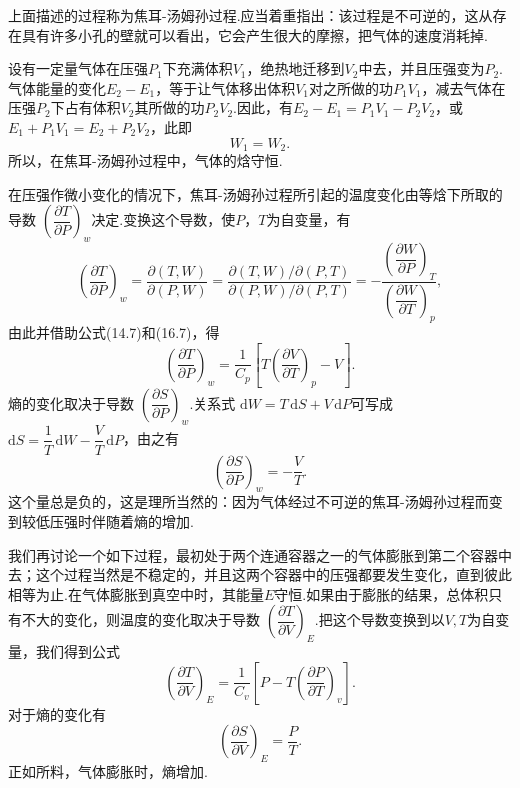 上面描述的过程称为焦耳-汤姆孙过程.应当着重指出：该过程是不可逆的，这从存在具有许多小孔的壁就可以看出，它会产生很大的摩擦，把气体的速度消耗掉.

设有一定量气体在压强$P_1$下充满体积$V_1$，绝热地迁移到$V_2$中去，并且压强变为$P_2$.气体能量的变化$E_2-E_1$，等于让气体移出体积$V_1$对之所做的功$P_1V_1$，减去气体在压强$P_2$下占有体积$V_2$其所做的功$P_2V_2$.因此，有$E_2-E_1=P_1V_1-P_2V_2$，或$E_1+P_1V_1=E_2+P_2V_2$，此即
\begin{equation}
  W_1=W_2.
\end{equation}
所以，在焦耳-汤姆孙过程中，气体的焓守恒.

在压强作微小变化的情况下，焦耳-汤姆孙过程所引起的温度变化由等焓下所取的导数
$\left(\dfrac{\partial T}{\partial P}\right)_w$决定.变换这个导数，使$P$，$T$为自变量，有
\begin{equation*}
  \left(\frac{\partial T}{\partial P}\right)_w
  =\frac{\partial(T,W)}{\partial(P,W)}
  =\frac{\partial(T,W)/\partial(P,T)}
  {\partial(P,W)/\partial(P,T)}
  =-\frac{\left(\dfrac{\partial W}{\partial P}\right)_T}
  {\left(\dfrac{\partial W}{\partial T}\right)_p},
\end{equation*}
由此并借助公式(14.7)和(16.7)，得
\begin{equation}
  \left(\frac{\partial T}{\partial P}\right)_w
  =\frac{1}{C_p}\left[T\left(\frac{\partial V}{\partial T}\right)_p
  -V\right].
\end{equation}
熵的变化取决于导数
$\left(\dfrac{\partial S}{\partial P}\right)_w$.关系式
$\mathrm{d}W=T\,\mathrm{d}S+V\,\mathrm{d}P$可写成
$\mathrm{d}S=\dfrac{1}{T}\,\mathrm{d}W-\dfrac{V}{T}\,\mathrm{d}P$，由之有
\begin{equation}
  \left(\frac{\partial S}{\partial P}\right)_w=-\frac{V}{T}.
\end{equation}
这个量总是负的，这是理所当然的：因为气体经过不可逆的焦耳-汤姆孙过程而变到较低压强时伴随着熵的增加.

我们再讨论一个如下过程，最初处于两个连通容器之一的气体膨胀到第二个容器中去；这个过程当然是不稳定的，并且这两个容器中的压强都要发生变化，直到彼此相等为止.在气体膨胀到真空中时，其能量$E$守恒.如果由于膨胀的结果，总体积只有不大的变化，则温度的变化取决于导数
$\left(\dfrac{\partial T}{\partial V}\right)_E$.把这个导数变换到以$V,T$为自变量，我们得到公式
\begin{equation}
  \left(\frac{\partial T}{\partial V}\right)_E
  =\frac{1}{C_v}\left[P-T\left(\frac{\partial P}{\partial T}\right)_v\right].
\end{equation}
对于熵的变化有
\begin{equation}
  \left(\frac{\partial S}{\partial V}\right)_E=\frac{P}{T}.
\end{equation}
正如所料，气体膨胀时，熵增加.

